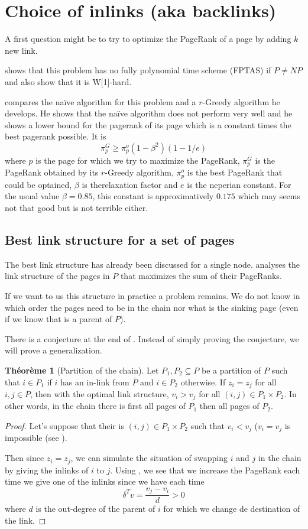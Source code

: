 \documentclass{article}
\newcommand{\1}{\mathbf{1}}
\theoremstyle{definition}
\newtheorem{mytheo}[mydef]{Théorème}
\begin{document}
\section{Choice of inlinks (aka backlinks)}
A first question might be to try to optimize the PageRank of a page
by adding $k$ new link.

\cite{olsen2010maximizing} shows that this problem has no fully polynomial time scheme (FPTAS) if $P \neq NP$ and also show that it is W[1]-hard.

\cite{olsen2010constant} compares the naïve algorithm for this problem and a $r$-Greedy algorithm he develops.
He shows that the naïve algorithm does not perform very well and he shows a lower bound for the pagerank of its page which is a constant times the best pagerank possible. It is
\[ \pi_p^G \geq \pi_p^o(1 - \beta^2)(1 - 1/e) \]
where $p$ is the page for which we try to maximize the PageRank,
$\pi_p^G$ is the PageRank obtained by its $r$-Greedy algorithm, $\pi_p^o$ is the best PageRank that could be optained, $\beta$ is therelaxation factor and $e$ is the neperian constant.
For the usual value $\beta = 0.85$, this constant is approximatively $0.175$ which may seems not that good but is not terrible either.

\subsection{Best link structure for a set of pages}
The best link structure has already been discussed for a single node.
\cite{de2008maximizing} analyses the link structure of the pages in $P$ that maximizes the sum of their PageRanks.

If we want to us this structure in practice a problem remains.
We do not know in which order the pages need to be in the chain
nor what is the sinking page (even if we know that is a parent of $P$).

There is a conjecture at the end of \cite{de2008maximizing}.
Instead of simply proving the conjecture, we will prove a generalization.
\begin{mytheo}[Partition of the chain]
  Let $P_1,P_2 \subseteq P$ be a partition of $P$ such that
  $i \in P_1$ if $i$ has an in-link from $\bar{P}$ and $i \in P_2$
  otherwise.
  If $z_i = z_j$ for all $i,j \in P$,
  then with the optimal link structure,
  $v_i > v_j$ for all $(i,j) \in P_1 \times P_2$.
  In other words, in the chain there is first all pages of
  $P_1$ then all pages of $P_2$.
  \begin{proof}
    Let's suppose that their is $(i,j) \in P_1 \times P_2$
    such that $v_i < v_j$ ($v_i = v_j$ is impossible (see \cite[theorem~12]{de2008maximizing}).

    Then since $z_i = z_j$, we can simulate the situation of swapping $i$ and $j$ in the chain
    by giving the inlinks of $i$ to $j$.
    Using \cite[theorem~5]{de2008maximizing}, we see that we increase the PageRank each time we give one of the inlinks since
    we have each time
    \[ \delta^Tv = \frac{v_j - v_i}{d} > 0 \]
    where $d$ is the out-degree of the parent of $i$ for which we change de destination of the link.
  \end{proof}
\end{mytheo}
\end{document}
